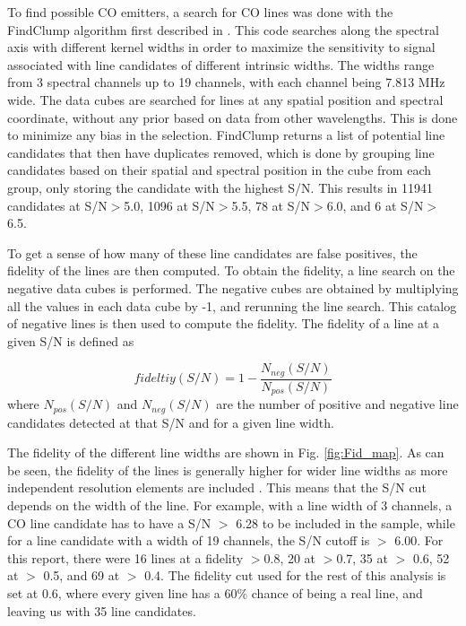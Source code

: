 To find possible CO emitters, a search for CO lines was done with the FindClump algorithm first described in \cite{walter2016alma}. This code searches along the spectral axis with different kernel widths in order to maximize the sensitivity to signal associated with line candidates of different intrinsic widths. The widths range from 3 spectral channels up to 19 channels, with each channel being 7.813 MHz wide. The data cubes are searched for lines at any spatial position and spectral coordinate, without any prior based on data from other wavelengths. This is done to minimize any bias in the selection. FindClump returns a list of potential line candidates that then have duplicates removed, which is done by grouping line candidates based on their spatial and spectral position in the cube from each group, only storing the candidate with the highest S/N. This results in 11941 candidates at S/N$>$5.0, 1096 at S/N$>$5.5, 78 at S/N$>$6.0, and 6 at S/N$>$6.5. 

To get a sense of how many of these line candidates are false positives, the fidelity of the lines are then computed. To obtain the fidelity, a line search on the negative data cubes is performed. The negative cubes are obtained by multiplying all the values in each data cube by -1, and rerunning the line search. This catalog of negative lines is then used to compute the fidelity. The fidelity of a line at a given S/N is defined as 

$$ fideltiy(S/N) = 1 - \frac{N_{neg}(S/N)}{N_{pos}(S/N)} $$ where $N_{pos}(S/N)$ and $N_{neg}(S/N)$ are the number of positive and negative line candidates detected at that S/N and for a given line width\cite{gonzalez2019alma}.

The fidelity of the different line widths are shown in Fig. \ref{fig:Fid_map}. As can be seen, the fidelity of the lines is generally higher for wider line widths as more independent resolution elements are included \cite{decarli2019alma}. This means that the S/N cut depends on the width of the line. For example, with a line width of 3 channels, a CO line candidate has to have a S/N $>$ 6.28 to be included in the sample, while for a line candidate with a width of 19 channels, the S/N cutoff is $>$ 6.00. For this report, there were 16 lines at a fidelity $>$0.8, 20 at $>$0.7, 35 at $>$ 0.6, 52 at $>$ 0.5, and 69 at $>$ 0.4. The fidelity cut used for the rest of this analysis is set at 0.6, where every given line has a 60\% chance of being a real line, and leaving us with 35 line candidates. %

